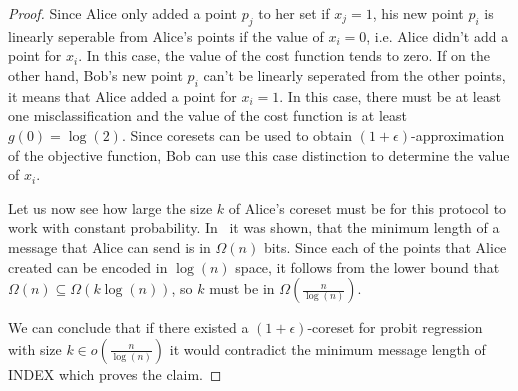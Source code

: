 \begin{proof}
    Since Alice only added a point $p_j$ to her set if $x_j = 1$, his
    new point $p_i$ is linearly seperable from Alice's points if
    the value of $x_i = 0$, i.e. Alice didn't add a point for $x_i$.
    In this case, the value of the cost function tends to zero.
    If on the other hand, Bob's new point $p_i$ can't be linearly
    seperated from the other points, it means that Alice added a point
    for $x_i = 1$. In this case, there must be at least one
    misclassification and the value of the cost function is at least
    $g(0) = \log(2)$.
    Since coresets can be used to obtain $(1 + \epsilon)$-approximation
    of the objective function, Bob can use this case distinction to
    determine the value of $x_i$.

    Let us now see how large the size $k$ of Alice's coreset must be
    for this protocol to work with constant probability.
    In~\cite{index} it was shown, that the minimum length of a message
    that Alice can send is in $\Omega(n)$ bits.
    Since each of the points that Alice created can be encoded in
    $\log(n)$ space, it follows from the lower bound that
    $\Omega(n) \subseteq \Omega(k \log(n))$, so $k$ must be in
    $\Omega\left(\frac{n}{\log(n)}\right)$.

    We can conclude that if there existed a $(1 + \epsilon)$-coreset
    for probit regression with size $k \in o\left(\frac{n}{\log(n)}\right)$
    it would contradict the minimum message length of
    INDEX which proves the claim.
\end{proof}